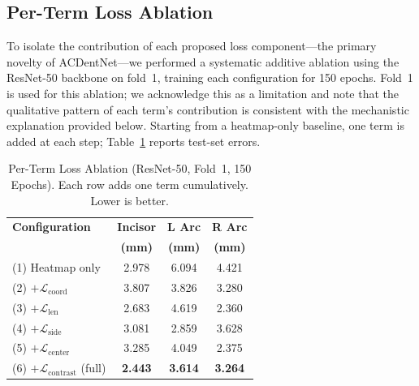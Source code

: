\documentclass[conference]{IEEEtran}
\begin{document}
\subsection{Per-Term Loss Ablation}
\label{sec:ablation}

To isolate the contribution of each proposed loss component---the primary novelty of
ACDentNet---we performed a systematic additive ablation using the ResNet-50 backbone on fold~1,
training each configuration for 150 epochs. Fold~1 is used for this ablation; we acknowledge
this as a limitation and note that the qualitative pattern of each term's contribution is
consistent with the mechanistic explanation provided below. Starting from a heatmap-only
baseline, one term is added at each step; Table~\ref{tab:ablation} reports test-set errors.

\begin{table}[htbp]
\caption{Per-Term Loss Ablation (ResNet-50, Fold~1, 150 Epochs). Each row adds one term
cumulatively. Lower is better.}
\begin{center}
\begin{tabular}{|l|c|c|c|}
\hline
\textbf{Configuration} & \textbf{Incisor} & \textbf{L Arc} & \textbf{R Arc} \\
 & \textbf{(mm)} & \textbf{(mm)} & \textbf{(mm)} \\
\hline
(1) Heatmap only                            & 2.978 & 6.094 & 4.421 \\
(2) $+\mathcal{L}_{\text{coord}}$           & 3.807 & 3.826 & 3.280 \\
(3) $+\mathcal{L}_{\text{len}}$             & 2.683 & 4.619 & 2.360 \\
(4) $+\mathcal{L}_{\text{side}}$            & 3.081 & 2.859 & 3.628 \\
(5) $+\mathcal{L}_{\text{center}}$          & 3.285 & 4.049 & 2.375 \\
(6) $+\mathcal{L}_{\text{contrast}}$ (full) & \textbf{2.443} & \textbf{3.614} & \textbf{3.264} \\
\hline
\end{tabular}
\label{tab:ablation}
\end{center}
\end{table}
\end{document}
